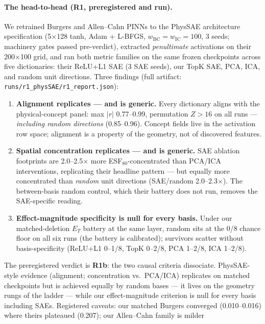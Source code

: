 \documentclass{article}
\begin{document}
\paragraph{The head-to-head (R1, preregistered and run).} We retrained
Burgers and Allen--Cahn PINNs to the PhysSAE architecture specification
(5$\times$128 tanh, Adam + L-BFGS, $w_{\mathrm{BC}}{=}w_{\mathrm{IC}}{=}100$,
3 seeds; machinery gates passed pre-verdict), extracted
\emph{penultimate} activations on their 200$\times$100 grid, and ran
both metric families on the same frozen checkpoints across five
dictionaries: their ReLU+L1 SAE (3 SAE seeds), our TopK SAE, PCA, ICA,
and random unit directions. Three findings (full artifact:
\texttt{runs/r1\_physSAE/r1\_report.json}):
\begin{enumerate}
  \item \textbf{Alignment replicates --- and is generic.} Every
        dictionary aligns with the physical-concept panel: max $|r|$
        0.77--0.99, permutation $Z > 16$ on all runs ---
        \emph{including random directions} (0.85--0.96). Concept
        fields live in the activation row space; alignment is a
        property of the geometry, not of discovered features.
  \item \textbf{Spatial concentration replicates --- and is generic.}
        SAE ablation footprints are 2.0--2.5$\times$ more
        ESF$_{80}$-concentrated than PCA/ICA interventions,
        replicating their headline pattern --- but equally more
        concentrated than \emph{random} unit directions
        (SAE/random 2.0--2.3$\times$). The between-basis random
        control, which their battery does not run, removes the
        SAE-specific reading.
  \item \textbf{Effect-magnitude specificity is null for every basis.}
        Under our matched-deletion $E_T$ battery at the same layer,
        random sits at the 0/8 chance floor on all six runs (the
        battery is calibrated); survivors scatter without
        basis-specificity (ReLU+L1 0--1/8, TopK 0--2/8, PCA 1--2/8,
        ICA 1--2/8).
\end{enumerate}
The preregistered verdict is \textbf{R1b}: the two causal criteria
dissociate. PhysSAE-style evidence (alignment; concentration vs.\
PCA/ICA) replicates on matched checkpoints but is achieved equally by
random bases --- it lives on the geometry rungs of the ladder --- while
our effect-magnitude criterion is null for every basis including SAEs.
Registered caveats: our matched Burgers converged (0.010--0.016) where
theirs plateaued (0.207); our Allen--Cahn family is milder
\end{document}
